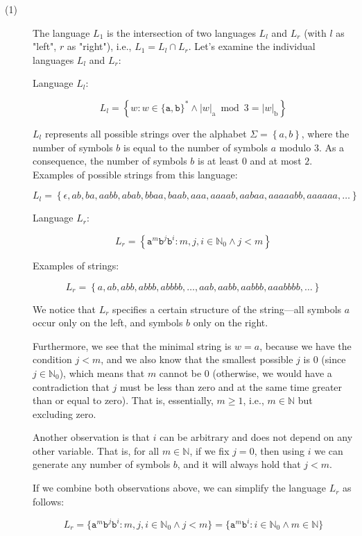\documentclass[10pt]{article}
\begin{document}
\begin{description}
\item[(1)]

The language $L_1$ is the intersection of two languages $L_{l}$ and $L_{r}$ (with $l$ as "left", $r$ as "right"), i.e., $L_1 = L_l \cap L_r$. Let's examine the individual languages $L_l$ and $L_r$:

Language $L_l$:

$$L_l = \left\{w: w \in\{\mathtt{a}, \mathtt{b}\}^{*} \wedge|w|_{\mathrm{a}} \bmod 3=|w|_{\mathrm{b}}\right\}$$

$L_l$ represents all possible strings over the alphabet $\Sigma = \left\{a, b\right\}$, where the number of symbols $b$ is equal to the number of symbols $a$ modulo 3. As a consequence, the number of symbols $b$ is at least $0$ and at most $2$. Examples of possible strings from this language:

$$L_l = \left\{
\epsilon,
ab, ba, aabb, abab, bbaa, baab, aaa, aaaab, aabaa, aaaaabb, aaaaaa, \dots 
\right\}$$

Language $L_r$:

$$L_r = \left\{\mathtt{a}^{m} \mathtt{b}^{j} \mathtt{b}^{i}: m, j, i \in \mathbb{N}_{0} \wedge j<m\right\}$$

Examples of strings:

$$L_r = \left\{
a, ab, abb, abbb, abbbb, \dots, aab, aabb, aabbb, aaabbbb, \dots 
\right\}$$

We notice that $L_r$ specifies a certain structure of the string—all symbols $a$ occur only on the left, and symbols $b$ only on the right. 

Furthermore, we see that the minimal string is $w = a$, because we have the condition $j < m$, and we also know that the smallest possible $j$ is $0$ (since $j \in \mathbb{N}_{0}$), which means that $m$ cannot be $0$ (otherwise, we would have a contradiction that $j$ must be less than zero and at the same time greater than or equal to zero). That is, essentially, $m \geq 1$, i.e., $m \in \mathbb{N}$ but excluding zero.

Another observation is that $i$ can be arbitrary and does not depend on any other variable. That is, for all $m \in \mathbb{N}$, if we fix $j = 0$, then using $i$ we can generate any number of symbols $b$, and it will always hold that $j < m$.

If we combine both observations above, we can simplify the language $L_r$ as follows:

$$L_r = \{\mathtt{a}^{m} \mathtt{b}^{j} \mathtt{b}^{i}: m, j, i \in \mathbb{N}_{0} \wedge j<m\}
= \{\mathtt{a}^{m} \mathtt{b}^{i}: i \in \mathbb{N}_{0} \land m \in \mathbb{N}\}$$


\end{description}
\end{document}
